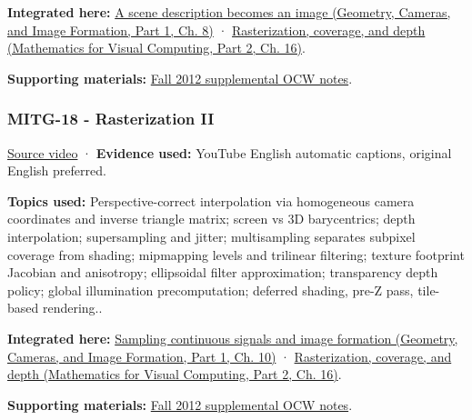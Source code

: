\textbf{Integrated here:} \href{../03-Geometry-Cameras-and-Image-Formation-P01/main.pdf\#nameddest=03-visual-computing-i-ch001-a-scene-description-becomes-an-image}{A scene description becomes an image (Geometry, Cameras, and Image Formation, Part 1, Ch. 8)} · \href{../02-Mathematics-for-Visual-Computing-P02/main.pdf\#nameddest=03-visual-computing-i-ch012-rasterization-coverage-and-depth}{Rasterization, coverage, and depth (Mathematics for Visual Computing, Part 2, Ch. 16)}.

\textbf{Supporting materials:} \href{https://ocw.mit.edu/courses/6-837-computer-graphics-fall-2012/pages/lecture-notes/}{Fall 2012 supplemental OCW notes}.

\subsubsection{MITG-18 - Rasterization II}\label{04-visual-computing-ii-ch036-mitg-18---rasterization-ii}

\hypertarget{04-visual-computing-ii-ch036-mitg-18---rasterization-ii}{}

\href{https://www.youtube.com/watch?v=bZAu7QtyYvo}{Source video} · \textbf{Evidence used:} YouTube English automatic captions, original English preferred.

\textbf{Topics used:} Perspective-correct interpolation via homogeneous camera coordinates and inverse triangle matrix; screen vs 3D barycentrics; depth interpolation; supersampling and jitter; multisampling separates subpixel coverage from shading; mipmapping levels and trilinear filtering; texture footprint Jacobian and anisotropy; ellipsoidal filter approximation; transparency depth policy; global illumination precomputation; deferred shading, pre-Z pass, tile-based rendering..

\textbf{Integrated here:} \href{../03-Geometry-Cameras-and-Image-Formation-P01/main.pdf\#nameddest=03-visual-computing-i-ch003-sampling-continuous-signals-and-image-formation}{Sampling continuous signals and image formation (Geometry, Cameras, and Image Formation, Part 1, Ch. 10)} · \href{../02-Mathematics-for-Visual-Computing-P02/main.pdf\#nameddest=03-visual-computing-i-ch012-rasterization-coverage-and-depth}{Rasterization, coverage, and depth (Mathematics for Visual Computing, Part 2, Ch. 16)}.

\textbf{Supporting materials:} \href{https://ocw.mit.edu/courses/6-837-computer-graphics-fall-2012/pages/lecture-notes/}{Fall 2012 supplemental OCW notes}.

